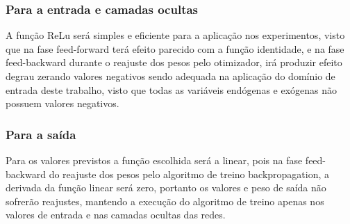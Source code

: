 \documentclass[	12pt, Times, openright, twoside, a4paper, english, brazil]{abntex2}
\begin{document}
	    \subsubsection{Para a entrada e camadas ocultas}
    	    A função ReLu será simples e eficiente para a aplicação nos experimentos, visto que na fase feed-forward terá efeito parecido com a função identidade, e na fase feed-backward durante o reajuste dos pesos pelo otimizador, irá produzir efeito degrau zerando valores negativos sendo adequada na aplicação do domínio de entrada deste trabalho, visto que todas as variáveis endógenas e exógenas não possuem valores negativos.
    	\subsubsection{Para a saída}
    	    Para os valores previstos a função escolhida será a linear, pois na fase feed-backward do reajuste dos pesos pelo algoritmo de treino backpropagation, a derivada da função linear será zero, portanto os valores e peso de saída não sofrerão reajustes, mantendo a execução do algoritmo de treino apenas nos valores de entrada e nas camadas ocultas das redes.
    	
\end{document}
